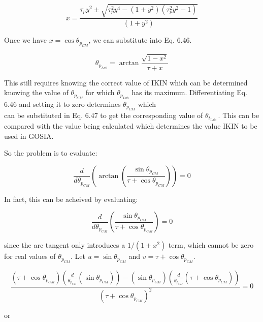 \documentclass[10pt]{article}
\begin{document}
\begin{equation*}
x=\frac{\tau_{p} y^{2} \pm \sqrt{\tau_{p}^{2} y^{4}-\left(1+y^{2}\right)\left(\tau_{p}^{2} y^{2}-1\right)}}{\left(1+y^{2}\right)} \tag{6.57}
\end{equation*}


Once we have $x=\cos \theta_{p_{C M}}$, we can substitute into Eq. 6.46.


\begin{equation*}
\theta_{p_{L a b}}=\arctan \frac{\sqrt{1-x^{2}}}{\tau+x} \tag{6.58}
\end{equation*}


This still requires knowing the correct value of IKIN which can be determined knowing the value of $\theta_{p_{C M}}$ for which $\theta_{p_{L a b}}$ has its maximum. Differentiating Eq. 6.46 and setting it to zero determines $\theta_{p_{C M}}$ which\\
can be substituted in Eq. 6.47 to get the corresponding value of $\theta_{t_{\text {Lab }}}$. This can be compared with the value being calculated which determines the value IKIN to be used in GOSIA.

So the problem is to evaluate:


\begin{equation*}
\frac{d}{d \theta_{p_{C M}}}\left(\arctan \left(\frac{\sin \theta_{p_{C M}}}{\tau+\cos \theta_{p_{C M}}}\right)\right)=0 \tag{6.59}
\end{equation*}


In fact, this can be acheived by evaluating:


\begin{equation*}
\frac{d}{d \theta_{p_{C M}}}\left(\frac{\sin \theta_{p_{C M}}}{\tau+\cos \theta_{p_{C M}}}\right)=0 \tag{6.60}
\end{equation*}


since the arc tangent only introduces a $1 /\left(1+x^{2}\right)$ term, which cannot be zero for real values of $\theta_{p_{C M}}$. Let $u=\sin \theta_{p_{C M}}$ and $v=\tau+\cos \theta_{p_{C M}}$.


\begin{equation*}
\frac{\left(\tau+\cos \theta_{p_{C M}}\right)\left(\frac{d}{\theta_{p_{C M}}}\left(\sin \theta_{p_{C M}}\right)\right)-\left(\sin \theta_{p_{C M}}\right)\left(\frac{d}{\theta_{p_{C M}}}\left(\tau+\cos \theta_{p_{C M}}\right)\right)}{\left(\tau+\cos \theta_{p_{C M}}\right)^{2}}=0 \tag{6.61}
\end{equation*}


or
\end{document}
